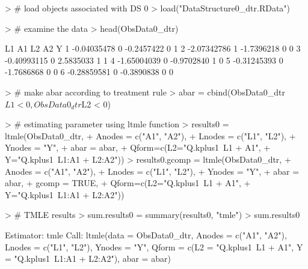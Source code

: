 \documentclass{exam}
\begin{document}
\begin{solution}
\begin{Schunk}
\begin{Sinput}
> # load objects associated with DS 0
> load("DataStructure0_dtr.RData")
\end{Sinput}
\end{Schunk}
\begin{Schunk}
\begin{Sinput}
> # examine the data
> head(ObsData0_dtr)
\end{Sinput}
\begin{Soutput}
           L1 A1         L2 A2 Y
1 -0.04035478  0 -0.2457422  0 1
2 -2.07342786  1 -1.7396218  0 0
3 -0.40993115  0  2.5835033  1 1
4 -1.65004039  0 -0.9702840  1 0
5 -0.31245393  0 -1.7686868  0 0
6 -0.28859581  0 -0.3890838  0 0
\end{Soutput}
\end{Schunk}
\begin{Schunk}
\begin{Sinput}
> # make abar according to treatment rule
> abar = cbind(ObsData0_dtr$L1 < 0, ObsData0_dtr$L2 < 0)
\end{Sinput}
\end{Schunk}
\begin{Schunk}
\begin{Sinput}
> # estimating parameter using ltmle function
> results0 = ltmle(ObsData0_dtr, 
+                    Anodes = c("A1", "A2"), 
+                    Lnodes = c("L1", "L2"), 
+                    Ynodes = "Y", 
+                    abar = abar, 
+                    Qform=c(L2="Q.kplus1~L1 + A1", 
+                            Y="Q.kplus1~L1:A1 + L2:A2"))
> results0.gcomp = ltmle(ObsData0_dtr, 
+                        Anodes = c("A1", "A2"), 
+                        Lnodes = c("L1", "L2"), 
+                        Ynodes = "Y", 
+                        abar = abar,
+                        gcomp = TRUE,
+                        Qform=c(L2="Q.kplus1~L1 + A1", 
+                                Y="Q.kplus1~L1:A1 + L2:A2"))
\end{Sinput}
\end{Schunk}
\begin{Schunk}
\begin{Sinput}
> # TMLE results
> sum.results0 = summary(results0, "tmle")
> sum.results0
\end{Sinput}
\begin{Soutput}
Estimator:  tmle 
Call:
ltmle(data = ObsData0_dtr, Anodes = c("A1", "A2"), Lnodes = c("L1", 
    "L2"), Ynodes = "Y", Qform = c(L2 = "Q.kplus1~L1 + A1", Y = "Q.kplus1~L1:A1 + L2:A2"), 
    abar = abar)


\end{Soutput}
\end{Schunk}
\end{solution}
\end{document}
